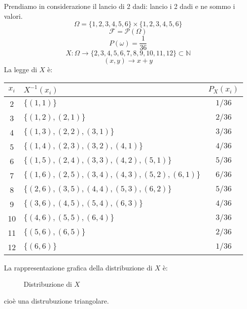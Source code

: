 \documentclass[a4paper]{article}
\theoremstyle{break}
\theoremstyle{break}
\theoremstyle{break}
\theoremstyle{break}
\begin{document}
\begin{example}
  Prendiamo in considerazione il lancio di 2 dadi: lancio i 2 dadi e ne sommo i valori.
  \[
  \Omega = \{1,2,3,4,5,6\} \times \{1,2,3,4,5,6\}
  \] 
  \[
    \mathcal{F} = \mathcal{P}(\Omega)
  \] 
  \[
  P(\omega) = \frac{1}{36}
  \] 
  \[
  X : \Omega \to \{2,3,4,5,6,7,8,9,10,11,12\} \subset \mathbb{N}
  \] 
  \[
    (x,y) \to x+y
  \] 
  La legge di \( X \) è:
  \begin{table}[H]
    \centering
    \begin{tabular}{|c|l|c|}
      \hline
      \( x_i \) & \( X^{-1}(x_i) \) & \( P_X(x_i) \) \\
      \hline
      2 & \(\{(1,1)\} \) & \( 1/36 \) \\
      3 & \(\{(1,2), (2,1)\} \) & \( 2/36 \) \\
      4 & \(\{(1,3), (2,2), (3,1)\} \) & \( 3/36 \) \\
      5 & \(\{(1,4), (2,3), (3,2), (4,1)\} \) & \( 4/36 \) \\
      6 & \(\{(1,5), (2,4), (3,3), (4,2), (5,1)\} \) & \( 5/36 \) \\
      7 & \(\{(1,6), (2,5), (3,4), (4,3), (5,2), (6,1)\} \) & \( 6/36 \) \\
      8 & \(\{(2,6), (3,5), (4,4), (5,3), (6,2)\} \) & \( 5/36 \) \\
      9 & \(\{(3,6), (4,5), (5,4), (6,3)\} \) & \( 4/36 \) \\
      10 & \(\{(4,6), (5,5), (6,4)\} \) & \( 3/36 \) \\
      11 & \(\{(5,6), (6,5)\} \) & \( 2/36 \) \\
      12 & \(\{(6,6)\} \) & \( 1/36 \) \\
      \hline
    \end{tabular}
  \end{table}

  \noindent La rappresentazione grafica della distribuzione di \( X \) è:
  \begin{figure}[H]
    \centering
    \caption{Distribuzione di \( X \)}
  \end{figure}
  cioè una distrubuzione triangolare.
\end{example}
\end{document}
